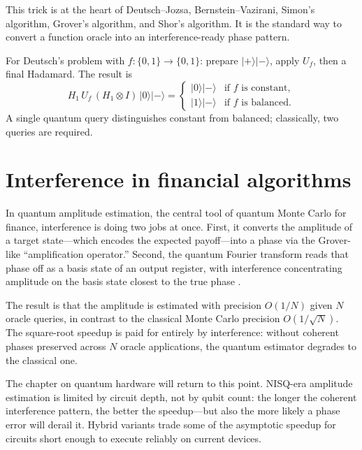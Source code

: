 This trick is at the heart of Deutsch--Jozsa, Bernstein--Vazirani, Simon's algorithm, Grover's algorithm, and Shor's algorithm. It is the standard way to convert a function oracle into an interference-ready phase pattern.

\begin{example}
For Deutsch's problem with $f:\{0,1\}\to\{0,1\}$: prepare $|+\rangle|-\rangle$, apply $U_f$, then a final Hadamard. The result is
\[
  H_1\, U_f\,(H_1\otimes I)\,|0\rangle|-\rangle = \begin{cases} |0\rangle|-\rangle & \text{if $f$ is constant}, \\ |1\rangle|-\rangle & \text{if $f$ is balanced.}\end{cases}
\]
A single quantum query distinguishes constant from balanced; classically, two queries are required.
\end{example}

\section{Interference in financial algorithms}

In quantum amplitude estimation, the central tool of quantum Monte Carlo for finance, interference is doing two jobs at once. First, it converts the amplitude of a target state---which encodes the expected payoff---into a phase via the Grover-like ``amplification operator.'' Second, the quantum Fourier transform reads that phase off as a basis state of an output register, with interference concentrating amplitude on the basis state closest to the true phase \citep{stamatopoulos_option_2020}.

The result is that the amplitude is estimated with precision $O(1/N)$ given $N$ oracle queries, in contrast to the classical Monte Carlo precision $O(1/\sqrt N)$. The square-root speedup is paid for entirely by interference: without coherent phases preserved across $N$ oracle applications, the quantum estimator degrades to the classical one.

The chapter on quantum hardware will return to this point. NISQ-era amplitude estimation is limited by circuit depth, not by qubit count: the longer the coherent interference pattern, the better the speedup---but also the more likely a phase error will derail it. Hybrid  variants \citep{cerezo_variational_2021,temme_error_2017} trade some of the asymptotic speedup for circuits short enough to execute reliably on current devices.

